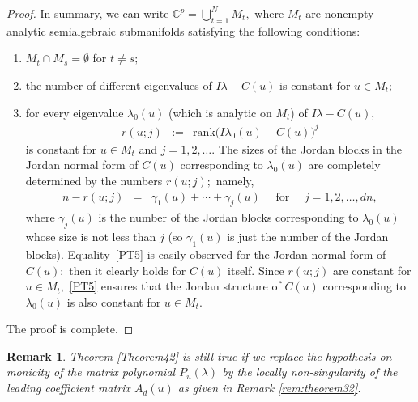 \documentclass[10pt,reqno]{amsart}
\theoremstyle{break-italic}
\theoremstyle{break-italic}
\theoremstyle{break-italic}
\theoremstyle{break-italic}
\theoremstyle{break-italic}
\theoremstyle{break-italic}
\theoremstyle{break-italic}
\theoremstyle{break-italic}
\theoremstyle{break-roman}
\newtheorem{remark}[satz]{Remark}
\theoremstyle{standard}
\theoremstyle{varthm-roman}
\theoremstyle{varthm-italic}
\theoremstyle{varthm-roman-break}
\theoremstyle{varthm-italic-break}
\theoremstyle{varthm-roman-no-punctuation}
\theoremstyle{varthm-italic-no-punctuation}
\numberwithin{equation}{section}
\begin{document}
\begin{proof}
In summary, we can write $\mathbb{C}^p = \displaystyle\bigcup_{t = 1}^N M_t,$ where $M_t$ are nonempty analytic semialgebraic submanifolds satisfying the following conditions:
\begin{enumerate}
\item[(a)] $M_t \cap M_s = \emptyset$ for $t \ne s;$
\item[(b)] the number of different eigenvalues of $I \lambda - C(u)$ is constant for $u \in M_t;$
\item[(c)] for every eigenvalue $\lambda_0(u)$ (which is analytic on $M_t$) of $I \lambda - C(u),$
\begin{eqnarray*}
r({u; j}) &:=& \mathrm{rank} \big (I \lambda_0(u) - C(u) \big )^j
\end{eqnarray*}
is constant for $u \in M_t$ and $j = 1, 2, \ldots.$ The sizes of the Jordan blocks in the Jordan normal form of $C(u)$ corresponding to $\lambda_0(u)$ are completely determined by the numbers
$r(u; j);$ namely,
\begin{eqnarray} \label{PT5}
n - r({u; j}) &=& \gamma_1(u) + \cdots + \gamma_j(u) \quad \textrm{ for } \quad j = 1, 2, \ldots, dn,
\end{eqnarray}
where $\gamma_j(u)$ is the number of the Jordan blocks corresponding to $\lambda_0(u)$ whose size is not less than $j$ (so $\gamma_1(u)$ is just the number of the Jordan blocks). Equality~\eqref{PT5} is easily observed for the Jordan normal form of $C(u);$ then it clearly holds for $C(u)$ itself. Since $r(u; j)$ are constant for $u \in M_t,$
\eqref{PT5} ensures that the Jordan structure of $C(u)$ corresponding to $\lambda_0(u)$ is also constant for $u \in M_t.$
\end{enumerate}
The proof is complete.
\end{proof}

\begin{remark} \label{rem:theorem42}\rm Theorem \ref{Theorem42} is still true if we replace the hypothesis on monicity of the matrix polynomial $P_u(\lambda)$ by the locally non-singularity of the leading coefficient matrix $A_d(u)$ as given in Remark \ref{rem:theorem32}.
\end{remark}









\end{document}
